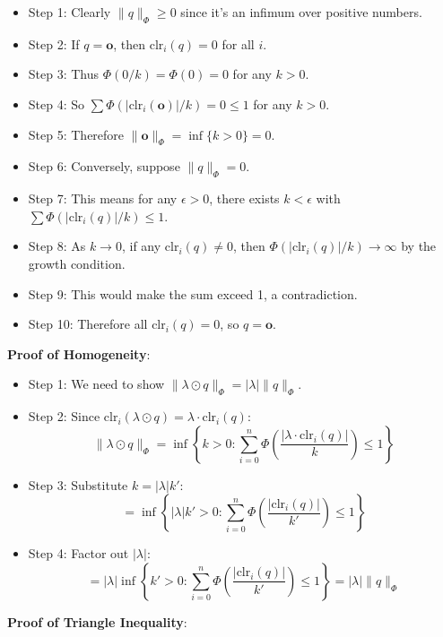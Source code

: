 \documentclass{amsart}
\theoremstyle{plain}
\theoremstyle{definition}
\theoremstyle{remark}
\begin{document}
\begin{itemize}
	\item Step 1: Clearly $\|q\|_\Phi \geq 0$ since it's an infimum over positive numbers.
	\item Step 2: If $q = \mathbf{o}$, then $\text{clr}_i(q) = 0$ for all $i$.
	\item Step 3: Thus $\Phi(0/k) = \Phi(0) = 0$ for any $k > 0$.
	\item Step 4: So $\sum \Phi(|\text{clr}_i(\mathbf{o})|/k) = 0 \leq 1$ for any $k > 0$.
	\item Step 5: Therefore $\|\mathbf{o}\|_\Phi = \inf\{k > 0\} = 0$.
	\item Step 6: Conversely, suppose $\|q\|_\Phi = 0$.
	\item Step 7: This means for any $\epsilon > 0$, there exists $k < \epsilon$ with $\sum \Phi(|\text{clr}_i(q)|/k) \leq 1$.
	\item Step 8: As $k \to 0$, if any $\text{clr}_i(q) \neq 0$, then $\Phi(|\text{clr}_i(q)|/k) \to \infty$ by the growth condition.
	\item Step 9: This would make the sum exceed 1, a contradiction.
	\item Step 10: Therefore all $\text{clr}_i(q) = 0$, so $q = \mathbf{o}$.
\end{itemize}

\textbf{Proof of Homogeneity}:

\begin{itemize}
	\item Step 1: We need to show $\|\lambda \odot q\|_\Phi = |\lambda| \|q\|_\Phi$.
	\item Step 2: Since $\text{clr}_i(\lambda \odot q) = \lambda \cdot \text{clr}_i(q)$:
\[
\|\lambda \odot q\|_\Phi = \inf \left\{ k > 0 : \sum_{i=0}^n \Phi\left(\frac{|\lambda \cdot \text{clr}_i(q)|}{k}\right) \leq 1 \right\}
\]
	\item Step 3: Substitute $k = |\lambda| k'$:
\[
= \inf \left\{ |\lambda|k' > 0 : \sum_{i=0}^n \Phi\left(\frac{|\text{clr}_i(q)|}{k'}\right) \leq 1 \right\}
\]
	\item Step 4: Factor out $|\lambda|$:
\[
= |\lambda| \inf \left\{ k' > 0 : \sum_{i=0}^n \Phi\left(\frac{|\text{clr}_i(q)|}{k'}\right) \leq 1 \right\} = |\lambda| \|q\|_\Phi
\]
\end{itemize}

\textbf{Proof of Triangle Inequality}:
\end{document}
